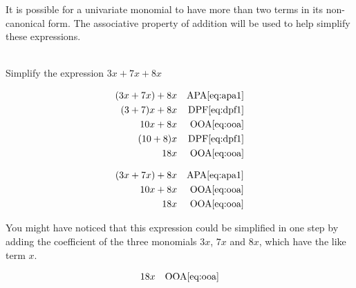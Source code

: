 \documentclass[20150903-160354-rs2.2-MarksMathNotebook.tex]{subfiles}
\begin{document}
It is possible for a univariate monomial to have more than two terms in its non-canonical form.  The associative property of addition will be used to help simplify these expressions.



\begin{example}[id:20141121-184652] \label{20141121-184652} \hfill \\

Simplify the expression $3x+7x+8x$

\soln
\solnsteps
\begin{align*}
(3x+7x)+8x && \text{APA} \eqref{eq:apa1} \\
(3+7)x+8x && \text{DPF} \eqref{eq:dpf1} \\
10x+8x && \text{OOA} \eqref{eq:ooa} \\
(10+8)x && \text{DPF} \eqref{eq:dpf1} \\
18x && \text{OOA} \eqref{eq:ooa}
\end{align*}

\soln

\lesssteps
\begin{align*}
(3x+7x)+8x && \text{APA} \eqref{eq:apa1} \\
10x+8x && \text{OOA} \eqref{eq:ooa} \\
18x && \text{OOA} \eqref{eq:ooa}
\end{align*}

You might have noticed that this expression could be simplified in one step by adding the coefficient of the three monomials $3x$, $7x$ and $8x$, which have the like term $x$.\\

\soln

\lesssteps
\begin{align*}
18x && \text{OOA} \eqref{eq:ooa}
\end{align*}

\end{example}
\end{document}
